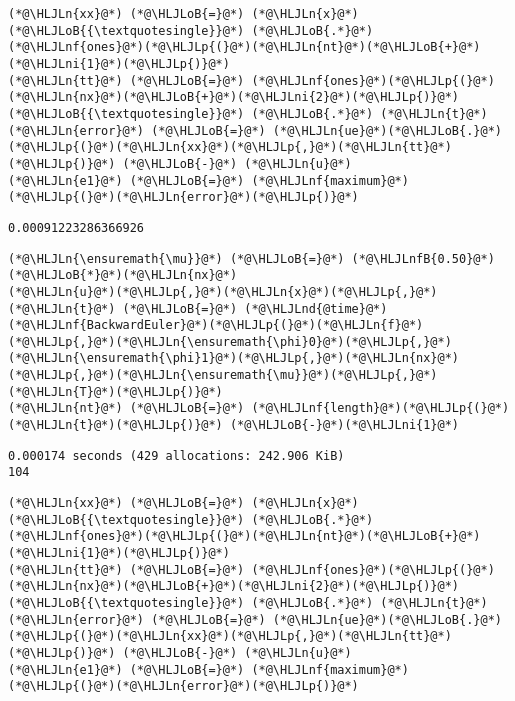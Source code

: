 \documentclass[12pt,a4paper]{article}
\newcommand{\HLJLn}[1]{#1}
\newcommand{\HLJLnd}[1]{\textcolor[RGB]{214,102,97}{#1}}
\newcommand{\HLJLnf}[1]{\textcolor[RGB]{66,102,213}{#1}}
\newcommand{\HLJLnfB}[1]{\textcolor[RGB]{59,151,46}{#1}}
\newcommand{\HLJLni}[1]{\textcolor[RGB]{59,151,46}{#1}}
\newcommand{\HLJLoB}[1]{\textcolor[RGB]{102,102,102}{\textbf{#1}}}
\newcommand{\HLJLp}[1]{#1}
\begin{document}
\begin{lstlisting}
(*@\HLJLn{xx}@*) (*@\HLJLoB{=}@*) (*@\HLJLn{x}@*)(*@\HLJLoB{{\textquotesingle}}@*) (*@\HLJLoB{.*}@*) (*@\HLJLnf{ones}@*)(*@\HLJLp{(}@*)(*@\HLJLn{nt}@*)(*@\HLJLoB{+}@*)(*@\HLJLni{1}@*)(*@\HLJLp{)}@*)
(*@\HLJLn{tt}@*) (*@\HLJLoB{=}@*) (*@\HLJLnf{ones}@*)(*@\HLJLp{(}@*)(*@\HLJLn{nx}@*)(*@\HLJLoB{+}@*)(*@\HLJLni{2}@*)(*@\HLJLp{)}@*)(*@\HLJLoB{{\textquotesingle}}@*) (*@\HLJLoB{.*}@*) (*@\HLJLn{t}@*)
(*@\HLJLn{error}@*) (*@\HLJLoB{=}@*) (*@\HLJLn{ue}@*)(*@\HLJLoB{.}@*)(*@\HLJLp{(}@*)(*@\HLJLn{xx}@*)(*@\HLJLp{,}@*)(*@\HLJLn{tt}@*)(*@\HLJLp{)}@*) (*@\HLJLoB{-}@*) (*@\HLJLn{u}@*) 
(*@\HLJLn{e1}@*) (*@\HLJLoB{=}@*) (*@\HLJLnf{maximum}@*)(*@\HLJLp{(}@*)(*@\HLJLn{error}@*)(*@\HLJLp{)}@*)
\end{lstlisting}

\begin{lstlisting}
0.00091223286366926
\end{lstlisting}


\begin{lstlisting}
(*@\HLJLn{\ensuremath{\mu}}@*) (*@\HLJLoB{=}@*) (*@\HLJLnfB{0.50}@*)(*@\HLJLoB{*}@*)(*@\HLJLn{nx}@*)
(*@\HLJLn{u}@*)(*@\HLJLp{,}@*)(*@\HLJLn{x}@*)(*@\HLJLp{,}@*)(*@\HLJLn{t}@*) (*@\HLJLoB{=}@*) (*@\HLJLnd{@time}@*) (*@\HLJLnf{BackwardEuler}@*)(*@\HLJLp{(}@*)(*@\HLJLn{f}@*)(*@\HLJLp{,}@*)(*@\HLJLn{\ensuremath{\phi}0}@*)(*@\HLJLp{,}@*)(*@\HLJLn{\ensuremath{\phi}1}@*)(*@\HLJLp{,}@*)(*@\HLJLn{nx}@*)(*@\HLJLp{,}@*)(*@\HLJLn{\ensuremath{\mu}}@*)(*@\HLJLp{,}@*)(*@\HLJLn{T}@*)(*@\HLJLp{)}@*)
(*@\HLJLn{nt}@*) (*@\HLJLoB{=}@*) (*@\HLJLnf{length}@*)(*@\HLJLp{(}@*)(*@\HLJLn{t}@*)(*@\HLJLp{)}@*) (*@\HLJLoB{-}@*)(*@\HLJLni{1}@*)
\end{lstlisting}

\begin{lstlisting}
0.000174 seconds (429 allocations: 242.906 KiB)
104
\end{lstlisting}


\begin{lstlisting}
(*@\HLJLn{xx}@*) (*@\HLJLoB{=}@*) (*@\HLJLn{x}@*)(*@\HLJLoB{{\textquotesingle}}@*) (*@\HLJLoB{.*}@*) (*@\HLJLnf{ones}@*)(*@\HLJLp{(}@*)(*@\HLJLn{nt}@*)(*@\HLJLoB{+}@*)(*@\HLJLni{1}@*)(*@\HLJLp{)}@*)
(*@\HLJLn{tt}@*) (*@\HLJLoB{=}@*) (*@\HLJLnf{ones}@*)(*@\HLJLp{(}@*)(*@\HLJLn{nx}@*)(*@\HLJLoB{+}@*)(*@\HLJLni{2}@*)(*@\HLJLp{)}@*)(*@\HLJLoB{{\textquotesingle}}@*) (*@\HLJLoB{.*}@*) (*@\HLJLn{t}@*)
(*@\HLJLn{error}@*) (*@\HLJLoB{=}@*) (*@\HLJLn{ue}@*)(*@\HLJLoB{.}@*)(*@\HLJLp{(}@*)(*@\HLJLn{xx}@*)(*@\HLJLp{,}@*)(*@\HLJLn{tt}@*)(*@\HLJLp{)}@*) (*@\HLJLoB{-}@*) (*@\HLJLn{u}@*) 
(*@\HLJLn{e1}@*) (*@\HLJLoB{=}@*) (*@\HLJLnf{maximum}@*)(*@\HLJLp{(}@*)(*@\HLJLn{error}@*)(*@\HLJLp{)}@*)
\end{lstlisting}
\end{document}
